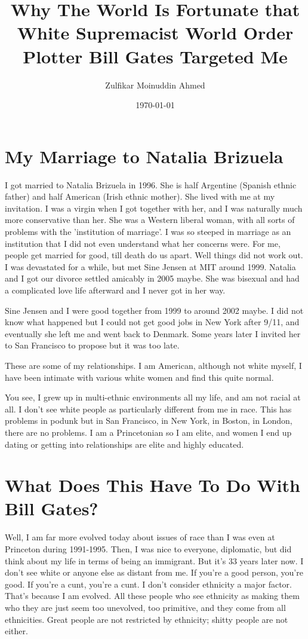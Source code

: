 \documentclass{amsart}
\title{Why The World Is Fortunate that White Supremacist World Order Plotter Bill Gates Targeted Me}
\author{Zulfikar Moinuddin Ahmed}
\date{\today}
\begin{document}
\maketitle

\section{My Marriage to Natalia Brizuela}

I got married to Natalia Brizuela in 1996.  She is half Argentine (Spanish ethnic father) and half American (Irish ethnic mother).  She lived with me at my invitation.  I was a virgin when I got together with her, and I was naturally much more conservative than her.  She was a Western liberal woman, with all sorts of problems with the 'institution of marriage'.  I was so steeped in marriage as an institution that I did not even understand what her concerns were.  For me, people get married for good, till death do us apart.  Well things did not work out.  I was devastated for a while, but met Sine Jensen at MIT around 1999.  Natalia and I got our divorce settled amicably in 2005 maybe.  She was bisexual and had a complicated love life afterward and I never got in her way.  

Sine Jensen and I were good together from 1999 to around 2002 maybe. I did not know what happened but I could not get good jobs in New York after 9/11, and eventually she left me and went back to Denmark.  Some years later I invited her to San Francisco to propose but it was too late.

These are some of my relationships.  I am American, although not white myself, I have been intimate with various white women and find this quite normal.  

You see, I grew up in multi-ethnic environments all my life, and am not racial at all.  I don't see white people as particularly different from me in race.  This has problems in podunk but in San Francisco, in New York, in Boston, in London, there are no problems.  I am a Princetonian so I am elite, and women I end up dating or getting into relationships are elite and highly educated. 

\section{What Does This Have To Do With Bill Gates?}

Well, I am far more evolved today about issues of race than I was even at Princeton during 1991-1995.  Then, I was nice to everyone, diplomatic, but did think about my life in terms of being an immigrant.  But it's 33 years later now.  I don't see white or anyone else as distant from me.  If you're a good person, you're good.  If you're a cunt, you're a cunt.  I don't consider ethnicity a major factor.  That's because I am evolved.  All these people who see ethnicity as making them who they are just seem too unevolved, too primitive, and they come from all ethnicities.  Great people are not restricted by ethnicity; shitty people are not either.
\end{document}
